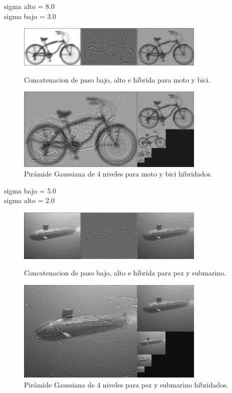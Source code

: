 \documentclass[12pt]{article}
\begin{document}
sigma alto = 8.0\\
sigma bajo = 3.0
\begin{figure}[H]
\centering
\parbox{9cm}{
\includegraphics[width=9cm]{images/ImagenMB.png}
\caption{Concatenacion de paso bajo, alto e híbrida para moto y bici.}
\label{fig:2figsA}}
\begin{minipage}{9cm}
\includegraphics[width=9cm]{images/PirMB.png}
\caption{Pirámide Gaussiana de 4 niveles para moto y bici hibridados.}
\label{fig:2figsB}
\end{minipage}
\end{figure}

sigma bajo = 5.0\\
sigma alto = 2.0
\begin{figure}[H]
\centering
\parbox{9cm}{
\includegraphics[width=9cm]{images/ImagenPS.png}
\caption{Concatenacion de paso bajo, alto e híbrida para pez y submarino.}
\label{fig:2figsA}}
\begin{minipage}{9cm}
\includegraphics[width=9cm]{images/PirPS.png}
\caption{Pirámide Gaussiana de 4 niveles para pez y submarino hibridados.}
\label{fig:2figsB}
\end{minipage}
\end{figure}
\end{document}
